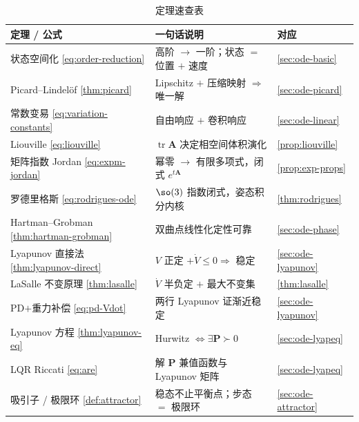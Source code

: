 \begin{table}[H]\centering\small
\caption{定理速查表}
\begin{tabular}{lll}
\toprule
定理 / 公式 & 一句话说明 & 对应 \\
\midrule
状态空间化 \cref{eq:order-reduction} & 高阶 $\to$ 一阶；状态 $=$ 位置 $+$ 速度 & \cref{sec:ode-basic} \\
Picard--Lindelöf \cref{thm:picard} & Lipschitz $+$ 压缩映射 $\Rightarrow$ 唯一解 & \cref{sec:ode-picard} \\
常数变易 \cref{eq:variation-constants} & 自由响应 $+$ 卷积响应 & \cref{sec:ode-linear} \\
Liouville \cref{eq:liouville} & $\operatorname{tr}\mathbf{A}$ 决定相空间体积演化 & \cref{prop:liouville} \\
矩阵指数 Jordan \cref{eq:expm-jordan} & 幂零 $\to$ 有限多项式，闭式 $e^{t\mathbf{A}}$ & \cref{prop:exp-props} \\
罗德里格斯 \cref{eq:rodrigues-ode} & $\so(3)$ 指数闭式，姿态积分内核 & \cref{thm:rodrigues} \\
Hartman--Grobman \cref{thm:hartman-grobman} & 双曲点线性化定性可靠 & \cref{sec:ode-phase} \\
Lyapunov 直接法 \cref{thm:lyapunov-direct} & $V$ 正定 $+\dot V\le0\Rightarrow$ 稳定 & \cref{sec:ode-lyapunov} \\
LaSalle 不变原理 \cref{thm:lasalle} & $\dot V$ 半负定 $+$ 最大不变集 & \cref{thm:lasalle} \\
PD$+$重力补偿 \cref{eq:pd-Vdot} & 两行 Lyapunov 证渐近稳定 & \cref{sec:ode-lyapunov} \\
Lyapunov 方程 \cref{thm:lyapunov-eq} & Hurwitz $\iff\exists\mathbf{P}\succ0$ & \cref{sec:ode-lyapeq} \\
LQR Riccati \cref{eq:are} & 解 $\mathbf{P}$ 兼值函数与 Lyapunov 矩阵 & \cref{sec:ode-lyapeq} \\
吸引子 / 极限环 \cref{def:attractor} & 稳态不止平衡点；步态 $=$ 极限环 & \cref{sec:ode-attractor} \\
\bottomrule
\end{tabular}
\end{table}

